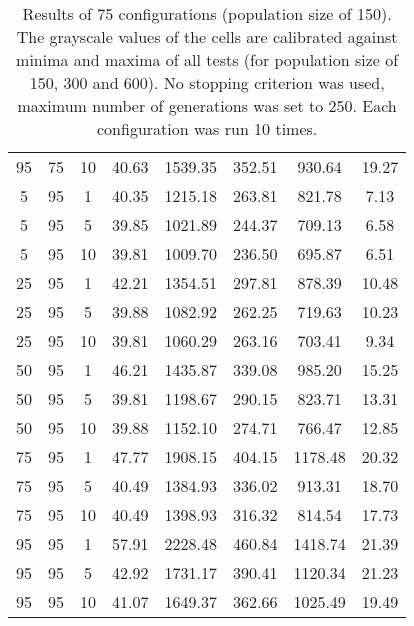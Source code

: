 \begin{table}[h]
\begin{tabular}{ccc|c|c|c|c|c}
95 & 75 & 10 & \cellcolor{gray!42}40.63 & \cellcolor{gray!1}1539.35 & \cellcolor{gray!1}352.51 & \cellcolor{gray!1}930.64 & 19.27\\
5 & 95 & 1 & \cellcolor{gray!45}40.35 & \cellcolor{gray!1}1215.18 & \cellcolor{gray!19}263.81 & \cellcolor{gray!5}821.78 & 7.13\\
5 & 95 & 5 & \cellcolor{gray!50}39.85 & \cellcolor{gray!33}1021.89 & \cellcolor{gray!41}244.37 & \cellcolor{gray!41}709.13 & 6.58\\
5 & 95 & 10 & \cellcolor{gray!50}39.81 & \cellcolor{gray!35}1009.70 & \cellcolor{gray!50}236.50 & \cellcolor{gray!45}695.87 & 6.51\\
25 & 95 & 1 & \cellcolor{gray!26}42.21 & \cellcolor{gray!1}1354.51 & \cellcolor{gray!1}297.81 & \cellcolor{gray!1}878.39 & 10.48\\
25 & 95 & 5 & \cellcolor{gray!50}39.88 & \cellcolor{gray!22}1082.92 & \cellcolor{gray!21}262.25 & \cellcolor{gray!37}719.63 & 10.23\\
25 & 95 & 10 & \cellcolor{gray!50}39.81 & \cellcolor{gray!26}1060.29 & \cellcolor{gray!20}263.16 & \cellcolor{gray!42}703.41 & 9.34\\
50 & 95 & 1 & \cellcolor{gray!1}46.21 & \cellcolor{gray!1}1435.87 & \cellcolor{gray!1}339.08 & \cellcolor{gray!1}985.20 & 15.25\\
50 & 95 & 5 & \cellcolor{gray!50}39.81 & \cellcolor{gray!1}1198.67 & \cellcolor{gray!1}290.15 & \cellcolor{gray!5}823.71 & 13.31\\
50 & 95 & 10 & \cellcolor{gray!50}39.88 & \cellcolor{gray!9}1152.10 & \cellcolor{gray!7}274.71 & \cellcolor{gray!23}766.47 & 12.85\\
75 & 95 & 1 & \cellcolor{gray!1}47.77 & \cellcolor{gray!1}1908.15 & \cellcolor{gray!1}404.15 & \cellcolor{gray!1}1178.48 & 20.32\\
75 & 95 & 5 & \cellcolor{gray!44}40.49 & \cellcolor{gray!1}1384.93 & \cellcolor{gray!1}336.02 & \cellcolor{gray!1}913.31 & 18.70\\
75 & 95 & 10 & \cellcolor{gray!44}40.49 & \cellcolor{gray!1}1398.93 & \cellcolor{gray!1}316.32 & \cellcolor{gray!8}814.54 & 17.73\\
95 & 95 & 1 & \cellcolor{gray!1}57.91 & \cellcolor{gray!1}2228.48 & \cellcolor{gray!1}460.84 & \cellcolor{gray!1}1418.74 & 21.39\\
95 & 95 & 5 & \cellcolor{gray!19}42.92 & \cellcolor{gray!1}1731.17 & \cellcolor{gray!1}390.41 & \cellcolor{gray!1}1120.34 & 21.23\\
95 & 95 & 10 & \cellcolor{gray!38}41.07 & \cellcolor{gray!1}1649.37 & \cellcolor{gray!1}362.66 & \cellcolor{gray!1}1025.49 & 19.49
\end{tabular}
\caption{Results of 75 configurations (population size of 150). The grayscale values of the cells are calibrated against minima and maxima of all tests (for population size of 150, 300 and 600). No stopping criterion was used, maximum number of generations was set to 250. Each configuration was run 10 times.}
\label{tab:res1}
\end{table}

